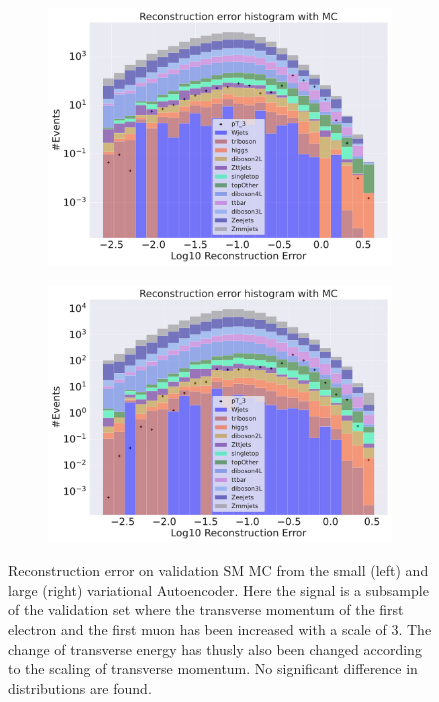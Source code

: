 \begin{figure}[H]
    \centering
    \begin{subfigure}{.45\textwidth}
        \includegraphics[width=\textwidth]{Figures/VAE_testing/small/b_data_recon_big_rm3_feats_sig_pT_3.pdf}
        \caption{ }
        \label{fig:VAE_small_pt_3}
    \end{subfigure}
    \hfill 
    \begin{subfigure}{.45\textwidth}
        \includegraphics[width=\textwidth]{Figures/VAE_testing/big/b_data_recon_big_rm3_feats_sig_pT_3.pdf}
        \caption{ }
        \label{fig:VAE_big_pt_3}
    \end{subfigure}
    \hfill 
    \caption[VAE | Reconstruction error $p_T$ altering of 3]{Reconstruction error on validation SM MC from the small (left) and large (right) variational Autoencoder. Here the signal is a subsample of the validation 
    set where the transverse momentum of the first electron and the first muon has been increased with a scale of $3$. The change of transverse 
    energy has thusly also been changed according to the scaling of transverse momentum. No significant difference in distributions are found.}
    \label{fig:VAE_big_small_pt_3}
\end{figure}

